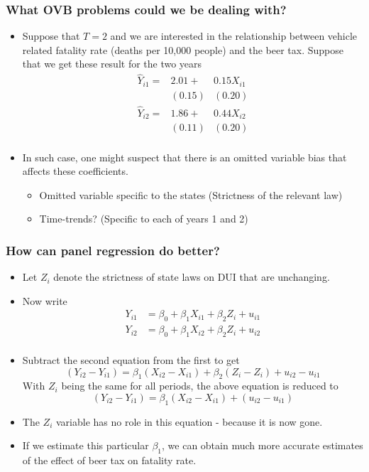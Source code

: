 \documentclass[aspectratio=169]{beamer}
\begin{document}
\begin{frame}
\frametitle{What OVB problems could we be dealing with?}
\begin{itemize}
\item Suppose that $T=2$ and we are interested in the relationship between vehicle related fatality rate (deaths per 10,000 people) and the beer tax. Suppose that we get these result for the two years
\[
\begin{aligned}
\hat{Y}_{i1} =&2.01 +&0.15X_{i1}\\
                    &(0.15)&(0.20) \\
\hat{Y}_{i2} =&1.86 +&0.44X_{i2}\\
                    &(0.11)&(0.20) \\                    
\end{aligned}
\]
\item  In such case, one might suspect that there is an omitted variable bias that affects these coefficients.
\begin{itemize}
\item Omitted variable specific to the states (Strictness of the relevant law)
\item Time-trends? (Specific to each of years 1 and 2)
\end{itemize}
\end{itemize}
\end{frame}

\begin{frame}
\frametitle{How can panel regression do better?}
\begin{itemize}
\item Let $Z_i$ denote the strictness of state laws on DUI that are unchanging. 
\item Now write
\[
\begin{aligned}
Y_{i1}& = \beta_0 + \beta_1X_{i1}+\beta_2 Z_{i}+u_{i1} \\                
Y_{i2}& = \beta_0 + \beta_1X_{i2}+\beta_2 Z_{i}+u_{i2} \\                
\end{aligned}
\]
\item Subtract the second equation from the first to get
\[
(Y_{i2}-Y_{i1}) = \beta_1(X_{i2}-X_{i1}) +\beta_2(Z_{i}-Z_{i}) + u_{i2}-u_{i1}
\]
With $Z_i$ being the same for all periods, the above equation is reduced to
\[
(Y_{i2}-Y_{i1}) = \beta_1(X_{i2}-X_{i1}) +(u_{i2}-u_{i1})
\]
\item The $Z_i$ variable has no role in this equation - because it is now gone.
\item If we estimate this particular $\beta_1$, we can obtain much more accurate estimates of the effect of beer tax on fatality rate. 
\end{itemize}
\end{frame}
\end{document}
